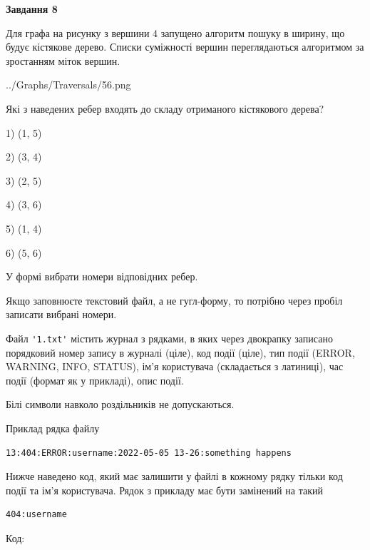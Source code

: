 \documentclass[12pt, ukrainian]{article}
\def\code#1{\Verb!#1!}
\begin{document}
{\begin {large}
{\begin {center}\textbf{Завдання 8}\end {center}}\par
Для графа на рисунку з вершини 4 запущено алгоритм пошуку в ширину, що будує кістякове дерево. Списки суміжності вершин переглядаються алгоритмом за зростанням міток вершин.\par
\begin{center}
	{../Graphs/Traversals/56.png}
\end{center}
\par Які з наведених ребер входять до складу отриманого кістякового дерева?\par
1) (1, 5)\par
2) (3, 4)\par
3) (2, 5)\par
4) (3, 6)\par
5) (1, 4)\par
6) (5, 6)\par
{\vskip 15pt} У формі вибрати номери відповідних ребер.


Якщо заповнюєте текстовий файл, а не гугл-форму, то потрібно через пробіл записа\-ти вибрані номери.\par
\newpage


Файл \code{'1.txt'} містить журнал з рядками, в яких через двокрапку записано поряд\-ко\-вий номер запису в журналі (ціле), код події (ціле), тип події (ERROR, \\WARNING, INFO, STATUS), ім'я користувача (складається з латиниці), час події (фор\-мат як у прикладі), опис події.

Білі символи навколо роздільників не допускаються.

Приклад рядка файлу



\begin{verbatim}
13:404:ERROR:username:2022-05-05 13-26:something happens
\end{verbatim}


Нижче наведено код, який має залишити у файлі в кожному рядку тільки код події та ім'я користувача. Рядок з прикладу має бути замінений на такий



\begin{verbatim}
404:username
\end{verbatim}




Код:




\end{large}}
\end{document}
